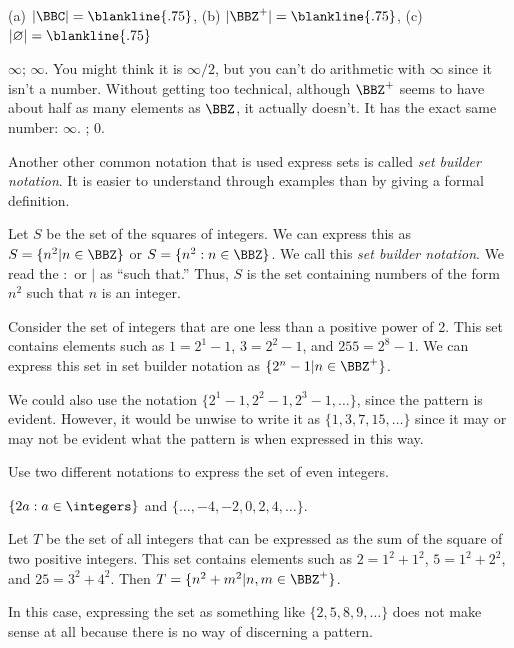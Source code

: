\begin{exer}
(a)  $|\BBC|=\blankline{.75}$,  
(b) $|\BBZ^+|=\blankline{.75}$, 
(c)  $|\varnothing|=\blankline{.75}$
\begin{answer}
$\infty$; $\infty$.  You might think it is $\infty/2$, but you can't do arithmetic with $\infty$ since it
isn't a number. Without getting too technical, although $\BBZ^+$ seems to have about half as many elements
as $\BBZ$, it actually doesn't.  It has the exact same number: $\infty$. ; $0$.
\end{answer}
\end{exer}

Another other common notation that is used express sets is called {\em set builder notation}. 
It is easier to understand through examples than by giving a formal definition.

\begin{exa}
Let $S$ be the set of the squares of integers.  
We can express this as
$S = \{n^2|n\in \BBZ\}$ or $S = \{n^2:n\in \BBZ\}$.  
We call this {\em set builder notation}.
We read the $:$ or $|$ as ``such that.''
Thus, $S$ is the set containing numbers of the form $n^2$ such that $n$ is an integer.
\end{exa}


\begin{exa}
Consider the set of integers that are one less than a positive power of 2. 
This set contains elements such as $1=2^1-1$, $3=2^2-1$, and $255=2^8-1$.
We can express this set in set builder notation as
$\{2^n-1|n\in\BBZ^+\}$.

We could also use the notation $\{2^1-1,2^2-1,2^3-1,\ldots\}$, since the pattern is evident.
However, it would be unwise to write it as $\{1,3,7,15,\ldots\}$ since it may or may not be
evident what the pattern is when expressed in this way.
\end{exa}


\begin{exer}
Use two different notations to express the set of even integers.

\noindent
\answerline
\begin{answer}
$\{2a : a\in\integers \}$ and $\{\ldots, -4, -2, 0, 2, 4, \ldots\}$.
\end{answer}
\end{exer}

\vspace*{-.1in} %

\begin{exa}
Let $T$ be the set of all integers that can be expressed as the sum of the square of two positive integers.
This set contains elements such as $2=1^2+1^2$, $5=1^2+2^2$, and $25=3^2+4^2$.
Then $T=\{n^2+m^2|n,m\in\BBZ^+\}$.

In this case, expressing the set as something like $\{2, 5, 8, 9,\ldots \}$ does not make sense at all because there
is no way of discerning a pattern.
\end{exa}

